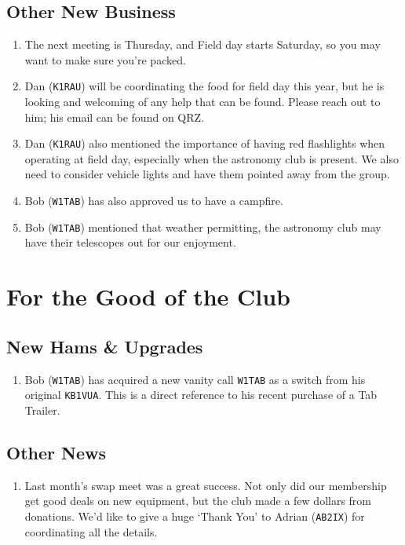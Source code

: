 \documentclass[10pt,letterpaper]{article}
\begin{document}
\subsection{Other New Business}
\begin{enumerate}
  \item The next meeting is Thursday, and Field day starts Saturday, so you may want to make sure you're packed.
  \item Dan (\texttt{K1RAU}) will be coordinating the food for field day this year, but he is looking and welcoming of any help that can be found. Please reach out to him; his email can be found on QRZ.
  \item Dan (\texttt{K1RAU}) also mentioned the importance of having red flashlights when operating at field day, especially when the astronomy club is present. We also need to consider vehicle lights and have them pointed away from the group.
  \item Bob (\texttt{W1TAB}) has also approved us to have a campfire.
  \item Bob (\texttt{W1TAB}) mentioned that weather permitting, the astronomy club may have their telescopes out for our enjoyment.
\end{enumerate}

\section{For the Good of the Club}

\subsection{New Hams \& Upgrades}
\begin{enumerate}
  \item Bob (\texttt{W1TAB}) has acquired a new vanity call \texttt{W1TAB} as a switch from his original \texttt{KB1VUA}. This is a direct reference to his recent purchase of a Tab Trailer.
\end{enumerate}

\subsection{Other News}
\begin{enumerate}
  \item Last month's swap meet was a great success. Not only did our membership get good deals on new equipment, but the club made a few dollars from donations. We'd like to give a huge `Thank You' to Adrian (\texttt{AB2IX}) for coordinating all the details.
\end{enumerate}
\end{document}
